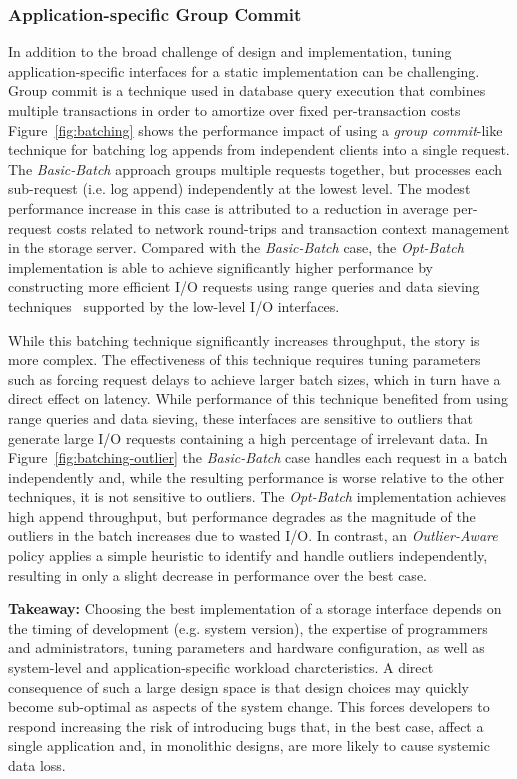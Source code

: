 \subsubsection{Application-specific Group Commit}
\label{sec:batch}

In addition to the broad challenge of design and implementation, tuning
application-specific interfaces for a static implementation can be
challenging.  Group commit is a technique used in database query execution
that combines multiple transactions in order to amortize over fixed
per-transaction costs~\cite{cite} Figure~\ref{fig:batching} shows the
performance impact of using a \emph{group commit}-like technique for batching
log appends from independent clients into a single request. The
\emph{Basic-Batch} approach groups multiple requests together, but processes
each sub-request (i.e. log append) independently at the lowest level.  The
modest performance increase in this case is attributed to a reduction in
average per-request costs related to network round-trips and transaction
context management in the storage server.  Compared with the
\emph{Basic-Batch} case, the \emph{Opt-Batch} implementation is able to
achieve significantly higher performance by constructing more efficient I/O
requests using range queries and data sieving techniques~\cite{750599}
supported by the low-level I/O interfaces.

While this batching technique significantly increases throughput, the story is
more complex. The effectiveness of this technique requires tuning parameters
such as forcing request delays to achieve larger batch sizes, which in turn
have a direct effect on latency. While performance of this technique benefited
from using range queries and data sieving, these interfaces are sensitive to
outliers that generate large I/O requests containing a high percentage of
irrelevant data.  In Figure~\ref{fig:batching-outlier} the \emph{Basic-Batch}
case handles each request in a batch independently and, while the resulting
performance is worse relative to the other techniques, it is not sensitive to
outliers. The \emph{Opt-Batch} implementation achieves high append throughput,
but performance degrades as the magnitude of the outliers in the batch
increases due to wasted I/O. In contrast, an \emph{Outlier-Aware} policy
applies a simple heuristic to identify and handle outliers independently,
resulting in only a slight decrease in performance over the best case.

\textbf{Takeaway:} Choosing the best implementation of a storage interface
depends on the timing of development (e.g. system version), the expertise of
programmers and administrators, tuning parameters and hardware configuration,
as well as system-level and application-specific workload charcteristics. A
direct consequence of such a large design space is that design choices may
quickly become sub-optimal as aspects of the system change.  This forces
developers to respond increasing the risk of introducing bugs that, in the
best case, affect a single application and, in monolithic designs, are more
likely to cause systemic data loss.

